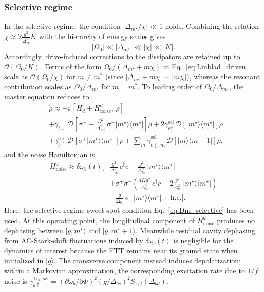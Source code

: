 \subsubsection{Selective regime}
In the selective regime, the condition $|\Delta_{m^\star}/\chi|\ll 1$ holds. Combining the relation $\chi \approx 2\frac{g^2}{\Delta_{bc}^2}K$ with the hierarchy of energy scales gives
\begin{equation}
|\Omega_0| \ll |\Delta_{m^\star}| \ll |\chi| \ll |K|.
\end{equation}
Accordingly, drive-induced corrections to the dissipators are retained up to $\mathcal{O}(\Omega_0/K)$. Terms of the form
$\Omega_0/(\Delta_{m^\star}+m\chi)$ in Eq.~\eqref{eq:Linblad_driven} scale as $\mathcal{O}(\Omega_0/\chi)$ for $m\neq m^*$ (since $|\Delta_{m^\star}+m\chi|\sim |m\chi|$), whereas the resonant contribution scales as $\Omega_0/\Delta_{m^\star}$ for $m=m^*$. To leading order of $\Omega_0/\Delta_{m^\star}$, the master equation reduces to
\begin{align}
&\dot{\rho} \approx -i\,[H_d + H_{\mathrm{noise}}^{d},\,\rho] \nonumber\\
&+ \gamma_{b\downarrow}\,\mathcal{D}\!\left[\sigma^- - \frac{\Omega_0^2}{\Delta_{m^\star}^2}\,\sigma^- |m^\star\rangle\langle m^\star|\right]\rho
+ 2\gamma_{c\phi}^{\mathrm{sel}}\,\mathcal{D}\!\left[|m^\star\rangle\langle m^\star|\right]\rho \nonumber\\
&+ \gamma_{b\uparrow}^{\mathrm{sel}}\,\mathcal{D}\!\left[\sigma^+ |m^\star\rangle\langle m^\star|\right]\rho
+ \sum_m \widetilde{\gamma}_{c\downarrow,m}^{\mathrm{sel}}\,\mathcal{D}\!\left[|m\rangle\langle m+1|\right]\rho ,
\end{align}
and the noise Hamiltonian is
\begin{align}
H_{\mathrm{noise}}^{d}
\approx \delta\omega_b(t)\Bigg[
&\frac{g^2}{\Delta_{bc}^2}\,c^\dagger c
+ \frac{g^2}{\Delta_{bc}^2}\,|m^\star\rangle\langle m^\star| \nonumber\\
&+ \sigma^+\sigma^-\!\left(\frac{4Kg^2}{\Delta_{bc}^3}\,c^\dagger c
+ 2\frac{g^2}{\Delta_{bc}^2}\,|m^\star\rangle\langle m^\star|\right) \nonumber\\
&- \frac{g}{\Delta_{bc}}\,\sigma^+ |m^\star\rangle\langle m^\star|
+ \mathrm{h.c.}
\Bigg].
\end{align}
Here, the selective-regime sweet-spot condition Eq.~\eqref{eq:Dm_selective} has been used. At this operating point, the longitudinal component of $H_{\mathrm{noise}}^{d}$ produces no dephasing between \(|g,m^\star\rangle\) and \(|g,m^\star+1\rangle\). Meanwhile residual cavity dephasing from AC-Stark-shift fluctuations induced by \(\delta\omega_b(t)\) is negligible for the dynamics of interest because the FTT remains near its ground state when initialized in \(|g\rangle\). The transverse component instead induces depolarization; within a Markovian approximation, the corresponding excitation rate due to \(1/f\) noise is
\(
\gamma_{b\uparrow}^{1/f,\mathrm{sel}}
= \left( \partial \omega_b / \partial \Phi \right)^2
\left( g / \Delta_{bc} \right)^2
S_{1/f}(\Delta_{bd}) .
\)

